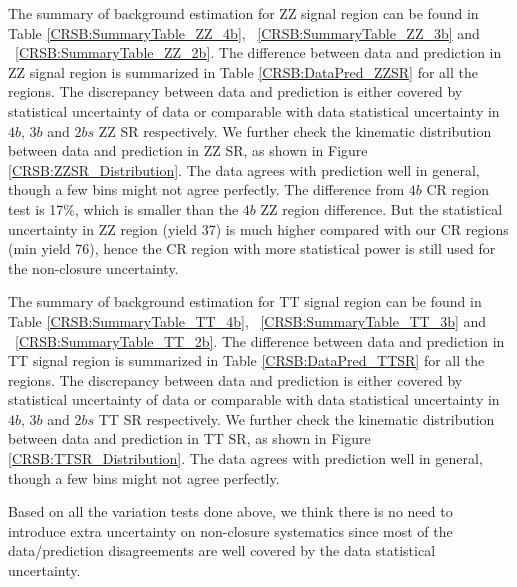 The summary of background estimation for ZZ signal region can be found in Table \ref{CRSB:SummaryTable_ZZ_4b}, ~\ref{CRSB:SummaryTable_ZZ_3b} and ~\ref{CRSB:SummaryTable_ZZ_2b}. The difference between data and prediction in ZZ signal region is summarized in Table \ref{CRSB:DataPred_ZZSR} for all the regions. The discrepancy between data and prediction is either covered by statistical uncertainty of data or comparable with data statistical uncertainty in $4b$, $3b$ and $2bs$ ZZ SR respectively. We further check the kinematic distribution between data and prediction in ZZ SR, as shown in Figure \ref{CRSB:ZZSR_Distribution}. The data agrees with prediction well in general, though a few bins might not agree perfectly. The difference from $4b$ CR region test is 17$\%$, which is smaller than the $4b$ ZZ region difference. But the statistical uncertainty in ZZ region (yield 37) is much higher compared with our CR regions (min yield 76), hence the CR region with more statistical power is still used for the non-closure uncertainty.

The summary of background estimation for TT signal region can be found in Table \ref{CRSB:SummaryTable_TT_4b}, ~\ref{CRSB:SummaryTable_TT_3b} and ~\ref{CRSB:SummaryTable_TT_2b}. The difference between data and prediction in TT signal region is summarized in Table \ref{CRSB:DataPred_TTSR} for all the regions. The discrepancy between data and prediction is either covered by statistical uncertainty of data or comparable with data statistical uncertainty in $4b$, $3b$ and $2bs$ TT SR respectively. We further check the kinematic distribution between data and prediction in TT SR, as shown in Figure \ref{CRSB:TTSR_Distribution}. The data agrees with prediction well in general, though a few bins might not agree perfectly. 

Based on all the variation tests done above, we think there is no need to introduce extra uncertainty on non-closure systematics since most of the data/prediction disagreements are well covered by the data statistical uncertainty.

